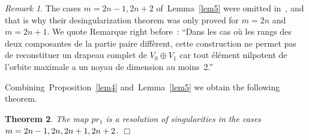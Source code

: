 \documentclass[12pt]{amsart}
\newtheorem{thm}{Theorem}[subsection]
\theoremstyle{definition}
\theoremstyle{remark}
\newtheorem{rem}[thm]{Remark}
\numberwithin{equation}{subsection}
\begin{document}
\begin{rem}
  The cases $m=2n-1,2n+2$ of~Lemma~\ref{lem5} were omitted in~\cite{GS}, and that is why their
  desingularization theorem was only proved for $m=2n$ and $m=2n+1$. We quote Remarque right
  before~\cite[Corollaire 2]{GS}: ``Dans les cas o\`u les rangs des deux composantes de la partie
  paire diff\`erent, cette
  construction ne permet pas de reconstituer un drapeau complet de $V_0\oplus V_1$ car tout
  \'el\'ement nilpotent de l’orbite maximale a un noyau de dimension au moins~2.''
\end{rem}

Combining~Proposition~\ref{lem4} and~Lemma~\ref{lem5} we obtain the following theorem.
\begin{thm}
  \label{thm1}
  The map $pr_1$ is a resolution of singularities in the cases $m=2n-1,2n,2n+\nobreak1,\allowbreak2n+\nobreak2$. \hfill $\Box$
  \end{thm}
\end{document}
